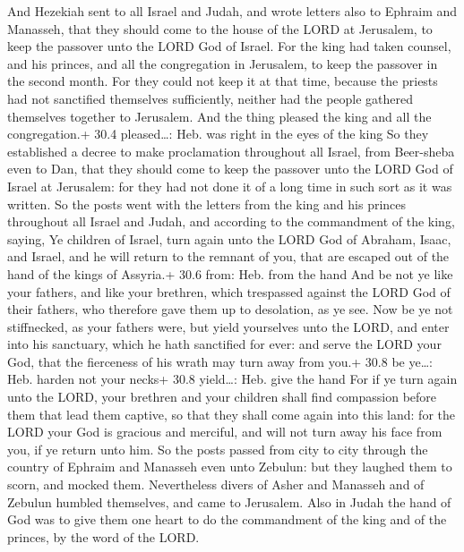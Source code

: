  And Hezekiah sent to all Israel and Judah, and wrote
letters also to Ephraim and Manasseh, that they should come to the house
of the LORD at Jerusalem, to keep the passover unto the LORD God of
Israel.  For the king had taken counsel, and his princes,
and all the congregation in Jerusalem, to keep the passover in the
second month.  For they could not keep it at that time,
because the priests had not sanctified themselves sufficiently, neither
had the people gathered themselves together to Jerusalem. 
And the thing pleased the king and all the congregation.+ 30.4
pleased\ldots: Heb. was right in the eyes of the king  So
they established a decree to make proclamation throughout all Israel,
from Beer-sheba even to Dan, that they should come to keep the passover
unto the LORD God of Israel at Jerusalem: for they had not done it of a
long time in such sort as it was written.  So the posts went
with the letters from the king and his princes throughout all Israel and
Judah, and according to the commandment of the king, saying, Ye children
of Israel, turn again unto the LORD God of Abraham, Isaac, and Israel,
and he will return to the remnant of you, that are escaped out of the
hand of the kings of Assyria.+ 30.6 from: Heb. from the hand
 And be not ye like your fathers, and like your brethren,
which trespassed against the LORD God of their fathers, who therefore
gave them up to desolation, as ye see.  Now be ye not
stiffnecked, as your fathers were, but yield yourselves unto the LORD,
and enter into his sanctuary, which he hath sanctified for ever: and
serve the LORD your God, that the fierceness of his wrath may turn away
from you.+ 30.8 be ye\ldots: Heb. harden not your necks+ 30.8
yield\ldots: Heb. give the hand  For if ye turn again unto
the LORD, your brethren and your children shall find compassion before
them that lead them captive, so that they shall come again into this
land: for the LORD your God is gracious and merciful, and will not turn
away his face from you, if ye return unto him.  So the
posts passed from city to city through the country of Ephraim and
Manasseh even unto Zebulun: but they laughed them to scorn, and mocked
them.  Nevertheless divers of Asher and Manasseh and of
Zebulun humbled themselves, and came to Jerusalem.  Also in
Judah the hand of God was to give them one heart to do the commandment
of the king and of the princes, by the word of the LORD.

